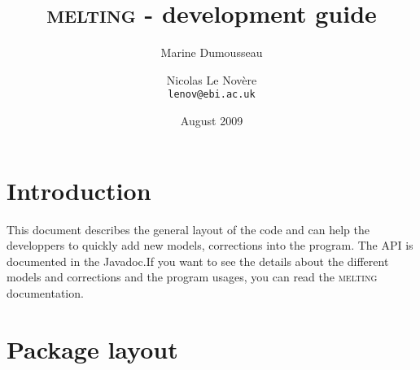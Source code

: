 \documentclass{article}
\begin{document}
\title{\textsc{melting} - development guide}
\author{Marine Dumousseau \and Nicolas Le Nov\`ere \\
  \texttt{lenov@ebi.ac.uk}}
\date{August 2009}
\maketitle

\newpage

\tableofcontents

\newpage

\section{Introduction}

This document describes the general layout of the code and can help the developpers
to quickly add new models, corrections into the program. The API is documented in the 
Javadoc.If you want to see the details about the different models and corrections and 
the program usages, you can read the \textsc{melting} documentation. 

\section{Package layout}
\end{document}
